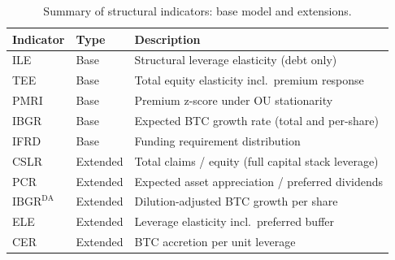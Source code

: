 \begin{table}[htbp]
\centering
\caption{Summary of structural indicators: base model and extensions.}
\label{tab:indicators_extended}
\small
\begin{tabular}{@{}llp{6.5cm}@{}}
\toprule
\textbf{Indicator} & \textbf{Type} & \textbf{Description} \\
\midrule
ILE & Base & Structural leverage elasticity (debt only) \\
TEE & Base & Total equity elasticity incl.\ premium response \\
PMRI & Base & Premium z-score under OU stationarity \\
IBGR & Base & Expected BTC growth rate (total and per-share) \\
IFRD & Base & Funding requirement distribution \\
\midrule
CSLR & Extended & Total claims / equity (full capital stack leverage) \\
PCR & Extended & Expected asset appreciation / preferred dividends \\
$\text{IBGR}^{\text{DA}}$ & Extended & Dilution-adjusted BTC growth per share \\
ELE & Extended & Leverage elasticity incl.\ preferred buffer \\
CER & Extended & BTC accretion per unit leverage \\
\bottomrule
\end{tabular}
\end{table}
